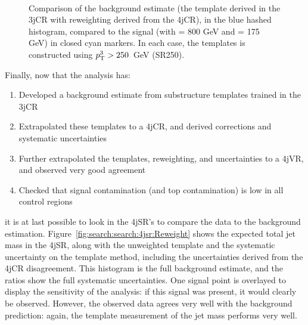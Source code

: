 \begin{figure}[!ht]
  \centering
  
  \\
    
  \caption{Comparison of the background estimate (the template derived in the 3jCR with reweighting derived from the 4jCR), in the blue hashed histogram, compared to the signal (with \mgluino = 800 GeV and \mchi = 175 GeV) in closed cyan markers. In each case, the \MJ templates is constructed using $p_{\text{T}}^{3}>250$~GeV (SR250).}
               
  \label{fig:search:search:4jsr:overlaySR250}
\end{figure}








Finally, now that the analysis has:
%
\begin{enumerate}
\item Developed a background estimate from substructure templates trained in the 3jCR
\item Extrapolated these templates to a 4jCR, and derived corrections and systematic uncertainties
\item Further extrapolated the templates, reweighting, and uncertainties to a 4jVR, and observed very good agreement
\item Checked that signal contamination (and top contamination) is low in all control regions
\end{enumerate}
%
it is at last possible to look in the 4jSR's to compare the data to the background estimation. Figure~\ref{fig:search:search:4jsr:Reweight} shows the expected total jet mass in the 4jSR, along with the unweighted template and the systematic uncertainty on the template method, including the uncertainties derived from the 4jCR disagreement. This histogram is the full background estimate, and the ratios show the full systematic uncertainties. One signal point is overlayed to display the sensitivity of the analysis: if this signal was present, it would clearly be observed. However, the observed data agrees very well with the background prediction: again, the template measurement of the jet mass performs very well.



